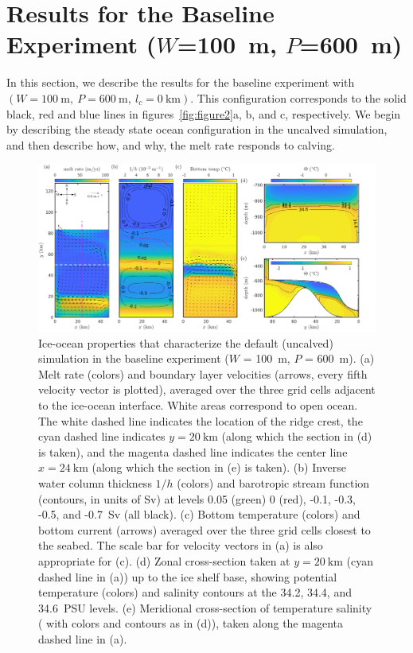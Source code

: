 \documentclass[draft]{agujournal2019}
\begin{document}
\section{Results for the Baseline Experiment ($W$=100~m, $P$=600~m)}\label{S:Baseline}
In this section, we describe the results for the baseline experiment with$(W=100~\text{m},~P=600~\text{m},~l_c=0~\text{km})$. This configuration corresponds to the solid black, red and blue lines in figures~\ref{fig:figure2}a, b, and c, respectively. We begin by describing the steady state ocean configuration in the uncalved simulation, and then describe how, and why, the melt rate responds to calving.

\begin{figure}
    \centering
    \includegraphics[width = \textwidth]{../make_figures/plots/figure3.pdf}
    \caption{Ice-ocean properties that characterize the default (uncalved) simulation in the baseline experiment ($W$ = 100~m, $P$ = 600~m). (a) Melt rate (colors) and boundary layer velocities (arrows, every fifth velocity vector is plotted), averaged over the three grid cells adjacent to the ice-ocean interface. White areas correspond to open ocean. The white dashed line indicates the location of the ridge crest, the cyan dashed line indicates $y=20~\text{km}$ (along which the section in (d) is taken), and the magenta dashed line indicates the center line $x = 24~\text{km}$ (along which the section in (e) is taken). (b) Inverse water column thickness $1/h$ (colors) and barotropic stream function (contours, in units of Sv) at levels 0.05 (green) 0 (red), -0.1, -0.3, -0.5, and -0.7~Sv (all black). (c) Bottom temperature (colors) and bottom current (arrows) averaged over the three grid cells closest to the seabed. The scale bar for velocity vectors in (a) is also appropriate for (c). (d) Zonal cross-section taken at $y=20~\text{km}$ (cyan dashed line in (a)) up to the ice shelf base, showing potential temperature (colors) and salinity contours at the 34.2, 34.4, and 34.6~PSU levels. (e) Meridional cross-section of temperature salinity ( with colors and contours as in (d)), taken along the magenta dashed line in (a).}
    \label{fig:figure3}
\end{figure}
\end{document}

